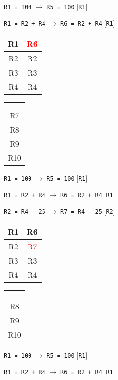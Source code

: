 \documentclass[12pt]{article}
\begin{document}
\begin{enumerate}
\begin{table}[H]
\begin{tabular}{|c|}
				\end{tabular}
			\end{table}
			\newpage{}
			\centerline{\texttt{R1 = 100} $\rightarrow$ \texttt{R5 = 100} [\texttt{R1}]}
			\centerline{\texttt{R1 = R2 + R4} $\rightarrow$ \texttt{R6 = R2 + R4} [\texttt{R1}]}
			\begin{table}[H]
				\centering
				\begin{tabular}{|c|c|}
					\hline R1 & \textcolor{red}{R6}\\ \hline R2 & R2\\ \hline R3 & R3\\ \hline R4 & R4\\ \hline
				\end{tabular}
				\hspace{5em}
				\begin{tabular}{|c|}
					\hline \\ \\ R7\\ R8\\ R9\\ R10\\ \hline
				\end{tabular}
			\end{table}
			\centerline{\texttt{R1 = 100} $\rightarrow$ \texttt{R5 = 100} [\texttt{R1}]}
			\centerline{\texttt{R1 = R2 + R4} $\rightarrow$ \texttt{R6 = R2 + R4} [\texttt{R1}]}
			\centerline{\texttt{R2 = R4 - 25} $\rightarrow$ \texttt{R7 = R4 - 25} [\texttt{R2}]}
			\begin{table}[H]
				\centering
				\begin{tabular}{|c|c|}
					\hline R1 & R6\\ \hline R2 & \textcolor{red}{R7}\\ \hline R3 & R3\\ \hline R4 & R4\\ \hline
				\end{tabular}
				\hspace{5em}
				\begin{tabular}{|c|}
					\hline \\ \\ \\ R8\\ R9\\ R10\\ \hline
				\end{tabular}
			\end{table}
			\centerline{\texttt{R1 = 100} $\rightarrow$ \texttt{R5 = 100} [\texttt{R1}]}
			\centerline{\texttt{R1 = R2 + R4} $\rightarrow$ \texttt{R6 = R2 + R4} [\texttt{R1}]}

\end{enumerate}
\end{document}
